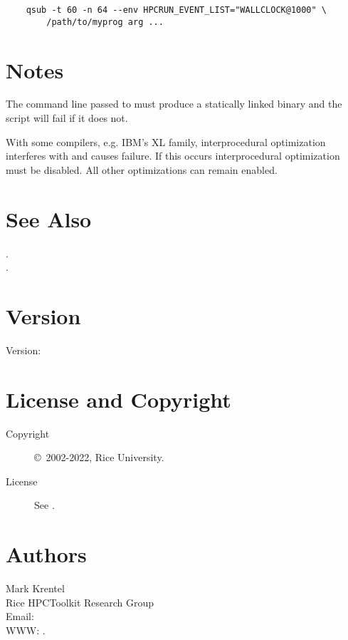 \documentclass[english]{article}
\begin{document}
\begin{verbatim}
    qsub -t 60 -n 64 --env HPCRUN_EVENT_LIST="WALLCLOCK@1000" \
        /path/to/myprog arg ...
\end{verbatim}


\section{Notes}

The command line passed to  must produce a statically linked binary and the  script will fail if it does not.

With some compilers, e.g. IBM's XL family,
interprocedural optimization interferes with  and causes failure.
If this occurs interprocedural optimization must be disabled.
All other optimizations can remain enabled.


\section{See Also}

.\\
.

\section{Version}

Version: \Version

\section{License and Copyright}

\begin{description}
\item[Copyright] \copyright\ 2002-2022, Rice University.
\item[License] See .
\end{description}

\section{Authors}

\noindent
Mark Krentel \\
Rice HPCToolkit Research Group \\
Email:  \\
WWW: .

\LatexManEnd
\end{document}
